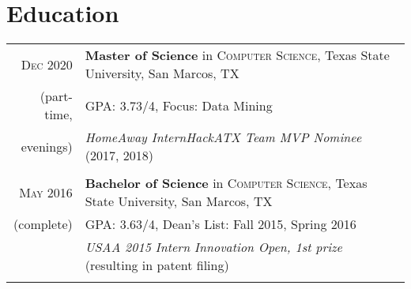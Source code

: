 \documentclass[a4paper,10pt]{article}
\begin{document}
\section{Education}
\begin{tabular}{rl}	
	\textsc{Dec} 2020 & \textbf{Master of Science} in \textsc{Computer Science}, Texas State University, San Marcos, TX\\
	
	(part-time, &\normalsize \textsc{GPA}: 3.73/4, Focus: Data Mining \\ 
	
	evenings)& \emph{HomeAway InternHackATX Team MVP Nominee} (2017, 2018) \\
	
	& \\
	
	\textsc{May} 2016 & \textbf{Bachelor of Science} in \textsc{Computer Science}, Texas State University, San Marcos, TX \\
	
	(complete) &\normalsize \textsc{GPA}: 3.63/4,  Dean's List: Fall 2015, Spring 2016 \\
	
	& \emph{USAA 2015 Intern Innovation Open, 1st prize} (resulting in patent filing)  \\
	
	& \\
\end{tabular}

\end{document}
